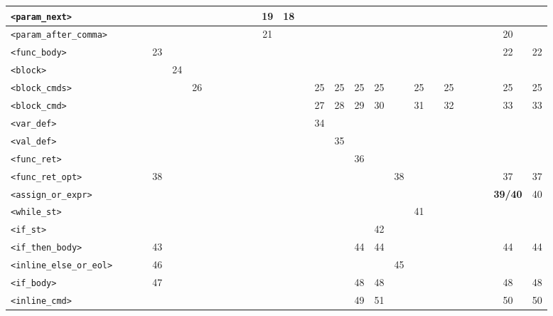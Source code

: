 \begin{center}
\begin{tabular}{|l|c|c|c|c|c|c|c|c|c|c|c|c|c|c|c|c|c|c|c|c|c|c|c|c|c|c|c|}
\texttt{<param\_next>} &  &  &  &  &  &  &  &  &  &  &  & 19 & 18 &  &  &  &  &  &  &  &  &  &  &  &  &  &  \\ \hline
\texttt{<param\_after\_comma>} &  &  &  &  &  &  &  &  &  &  &  & 21 &  &  &  &  &  &  &  &  &  &  &  &  &  & 20 &  \\ \hline
\texttt{<func\_body>} &  &  &  & 23 &  &  &  &  &  &  &  &  &  &  &  &  &  &  &  &  &  &  &  &  &  & 22 & 22 \\ \hline
\texttt{<block>} &  &  &  &  & 24 &  &  &  &  &  &  &  &  &  &  &  &  &  &  &  &  &  &  &  &  &  &  \\ \hline
\texttt{<block\_cmds>} &  &  &  &  &  & 26 &  &  &  &  &  &  &  &  & 25 & 25 & 25 & 25 &  & 25 &  & 25 &  &  &  & 25 & 25 \\ \hline
\texttt{<block\_cmd>} &  &  &  &  &  &  &  &  &  &  &  &  &  &  & 27 & 28 & 29 & 30 &  & 31 &  & 32 &  &  &  & 33 & 33 \\ \hline
\texttt{<var\_def>} &  &  &  &  &  &  &  &  &  &  &  &  &  &  & 34 &  &  &  &  &  &  &  &  &  &  &  &  \\ \hline
\texttt{<val\_def>} &  &  &  &  &  &  &  &  &  &  &  &  &  &  &  & 35 &  &  &  &  &  &  &  &  &  &  &  \\ \hline
\texttt{<func\_ret>} &  &  &  &  &  &  &  &  &  &  &  &  &  &  &  &  & 36 &  &  &  &  &  &  &  &  &  &  \\ \hline
\texttt{<func\_ret\_opt>} &  &  &  & 38 &  &  &  &  &  &  &  &  &  &  &  &  &  &  & 38 &  &  &  &  &  &  & 37 & 37 \\ \hline
\texttt{<assign\_or\_expr>} &  &  &  &  &  &  &  &  &  &  &  &  &  &  &  &  &  &  &  &  &  &  &  &  &  & \textbf{39/40} & 40 \\ \hline
\texttt{<while\_st>} &  &  &  &  &  &  &  &  &  &  &  &  &  &  &  &  &  &  &  & 41 &  &  &  &  &  &  &  \\ \hline
\texttt{<if\_st>} &  &  &  &  &  &  &  &  &  &  &  &  &  &  &  &  &  & 42 &  &  &  &  &  &  &  &  &  \\ \hline
\texttt{<if\_then\_body>} &  &  &  & 43 &  &  &  &  &  &  &  &  &  &  &  &  & 44 & 44 &  &  &  &  &  &  &  & 44 & 44 \\ \hline
\texttt{<inline\_else\_or\_eol>} &  &  &  & 46 &  &  &  &  &  &  &  &  &  &  &  &  &  &  & 45 &  &  &  &  &  &  &  &  \\ \hline
\texttt{<if\_body>} &  &  &  & 47 &  &  &  &  &  &  &  &  &  &  &  &  & 48 & 48 &  &  &  &  &  &  &  & 48 & 48 \\ \hline
\texttt{<inline\_cmd>} &  &  &  &  &  &  &  &  &  &  &  &  &  &  &  &  & 49 & 51 &  &  &  &  &  &  &  & 50 & 50 \\ \hline

\end{tabular}
\end{center}

